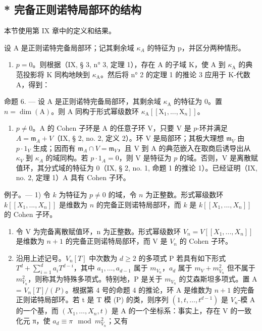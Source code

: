 \subsection{* 完备正则诺特局部环的结构}

本节使用第 IX 章中的定义和结果。

设 A 是正则诺特完备局部环；记其剩余域 \(\kappa_{A}\) 的特征为 p，并区分两种情形。

\begin{enumerate}
\def\labelenumi{\Alph{enumi})}
\tightlist
\item
  \(p = 0\)。则根据（IX, § 3, n° 3, 定理 1），存在 A 的子域 K，使 A 到 \(\kappa_{\mathrm{A}}\) 的典范投影将 K 同构地映到 \(\kappa_{\mathrm{A}}\)。然后将 n° 2 的定理 1 的推论 3 应用于 K-代数 A，得到：
\end{enumerate}

命题 6. --- 设 A 是正则诺特完备局部环，其剩余域 \(\kappa_{\mathrm{A}}\) 的特征为 0。置 \(n = \dim(\mathrm{A})\)。则 A 同构于形式幂级数环 \(\kappa_{\mathrm{A}}[[\mathrm{X}_{1}, ..., \mathrm{X}_{n}]]\)。

\begin{enumerate}
\def\labelenumi{\Alph{enumi})}
\setcounter{enumi}{1}
\tightlist
\item
  \(p \neq 0\)。A 的 Cohen 子环是 A 的任意子环 V，只要 V 是 \(p\)-环并满足 \(A = \mathfrak{m}_{A} + V\)（IX, § 2, no. 2, 定义 2）。环 V 是局部环；其极大理想 \(\mathfrak{m}_{V}\) 由 \(p \cdot 1_{V}\) 生成；因而有 \(\mathfrak{m}_{A} \cap V = \mathfrak{m}_{V}\)，且 V 到 A 的典范嵌入在取商后诱导出从 \(\kappa_{V}\) 到 \(\kappa_{A}\) 的域同构。若 \(p \cdot 1_{A} = 0\)，则 V 是特征为 \(p\) 的域。否则，V 是离散赋值环，其分式域的特征为 0（IX, § 2, no. 1, 命题 1 的推论 1）。已经证明（IX, no. 2, 定理 1）A 具有 Cohen 子环。
\end{enumerate}

例子。--- 1) 令 \(k\) 为特征为 \(p \neq 0\) 的域，令 \(n\) 为正整数。形式幂级数环 \(k[[X_1, ..., X_n]]\) 是维数为 \(n\) 的完备正则诺特局部环，而 \(k\) 是 \(k[[X_1, ..., X_n]]\) 的 Cohen 子环。

\begin{enumerate}
\def\labelenumi{\arabic{enumi})}
\setcounter{enumi}{1}
\item
  令 V 为完备离散赋值环，n 为正整数。形式幂级数环 \(V_{n} = V[[X_{1}, ..., X_{n}]]\) 是维数为 \(n + 1\) 的完备正则诺特局部环，而 V 是 \(V_{n}\) 的 Cohen 子环。
\item
  沿用上述记号。\(V_{n}[T]\) 中次数为 \(d \geqslant 2\) 的多项式 P 若具有如下形式 \(T^{d} + \sum_{i=1}^{d} a_{i} T^{d-i}\)，其中 \(a_{1}, \ldots, a_{d-1}\) 属于 \(m_{V_{n}}\)，\(a_{d}\) 属于 \(m_{V} + m_{V_{n}}^{2}\) 但不属于 \(m_{V_{n}}^{2}\)，则称其为特殊多项式。特别地，P 是关于 \(m_{V_{n}}\) 的艾森斯坦多项式。置 A = \(V_{n}[T]/(P)\)。根据第 4 号的命题 4 的推论，环 A 是维数为 \(n + 1\) 的完备正则诺特局部环。若 t 是 T 模 (P) 的类，则序列 \((1, t, \ldots, t^{d-1})\) 是 \(V_{n}\)-模 A 的一个基，而 \((X_{1}, \ldots, X_{n}, t)\) 是 A 的一个坐标系：事实上，存在 V 的一致化元 π，使 \(a_{d} \equiv \pi \mod m_{V_{n}}^{2}\)；又有
\end{enumerate}

